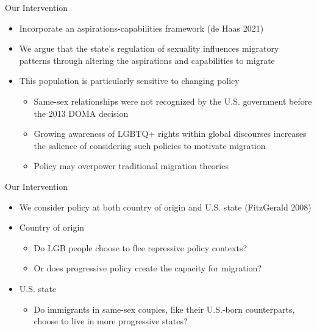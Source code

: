 \documentclass[
  ignorenonframetext,
]{beamer}
\providecommand{\tightlist}{%
  \setlength{\itemsep}{0pt}\setlength{\parskip}{0pt}}
\begin{document}
\begin{frame}{Our Intervention}
\protect\hypertarget{our-intervention}{}
\begin{itemize}
\tightlist
\item
  Incorporate an aspirations-capabilities framework (de Haas 2021)
\item
  We argue that the state's regulation of sexuality influences migratory
  patterns through altering the aspirations and capabilities to migrate
\item
  This population is particularly sensitive to changing policy

  \begin{itemize}
  \tightlist
  \item
    Same-sex relationships were not recognized by the U.S. government
    before the 2013 DOMA decision
  \item
    Growing awareness of LGBTQ+ rights within global discourses
    increases the salience of considering such policies to motivate
    migration
  \item
    Policy may overpower traditional migration theories
  \end{itemize}
\end{itemize}
\end{frame}

\begin{frame}{Our Intervention}
\protect\hypertarget{our-intervention-1}{}
\begin{itemize}
\tightlist
\item
  We consider policy at both country of origin and U.S. state
  (FitzGerald 2008)
\item
  Country of origin

  \begin{itemize}
  \tightlist
  \item
    Do LGB people choose to flee repressive policy contexts?
  \item
    Or does progressive policy create the capacity for migration?
  \end{itemize}
\item
  U.S. state

  \begin{itemize}
  \tightlist
  \item
    Do immigrants in same-sex couples, like their U.S.-born
    counterparts, choose to live in more progressive states?
  \end{itemize}
\end{itemize}
\end{frame}
\end{document}
